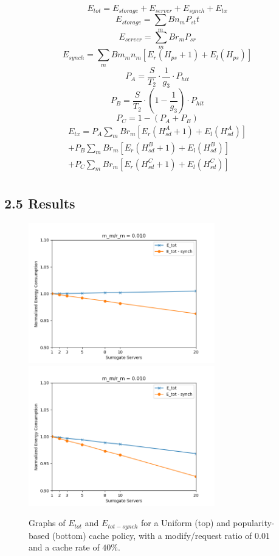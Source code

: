 \documentclass[
	a4paper, %
	10pt, %
	unnumberedsections, %
	twoside, %
]{LTJournalArticle}
\begin{document}
\normalsize
\[E_{tot} = E_{storage} + E_{server} + E_{synch} + E_{tx}\]
\[E_{storage} = \sum_mBn_mP_{st}t\]
\[E_{server} = \sum_mBr_mP_{sr}\]
\[E_{synch} = \sum_mBm_mn_m[E_r(H_{ps} + 1) + E_l(H_{ps})]\]
\[P_A = \frac{S}{T_2} \cdot \frac{1}{g_3} \cdot P_{hit}\]
\[P_B = \frac{S}{T_2} \cdot \left(1 - \frac{1}{g_3}\right) \cdot P_{hit}\]
\[P_C = 1 - (P_A + P_B)\]
\begin{multline*}
    E_{tx} = P_A\sum_mBr_m[E_r(H^A_{sd} + 1) + E_l(H^A_{sd})] \\
      + P_B\sum_mBr_m[E_r(H^B_{sd} + 1) + E_l(H^B_{sd})] \\
      + P_C\sum_mBr_m[E_r(H^C_{sd} + 1) + E_l(H^C_{sd})] \\
\end{multline*}

\subsection{2.5 Results}
\begin{figure}[!hbt]
	\begin{center}
		\includegraphics[width=8.1cm]{plots/sc40ratio0.01uniform.png}
            \includegraphics[width=8.1cm]{plots/sc40ratio0.01zipf.png}
	\end{center}
	\caption{Graphs of $E_{tot}$ and $E_{tot - synch}$ for a Uniform (top) and popularity-based (bottom) cache policy, with a modify/request ratio of $0.01$ and a cache rate of $40\%$.}	
\end{figure}
\end{document}
